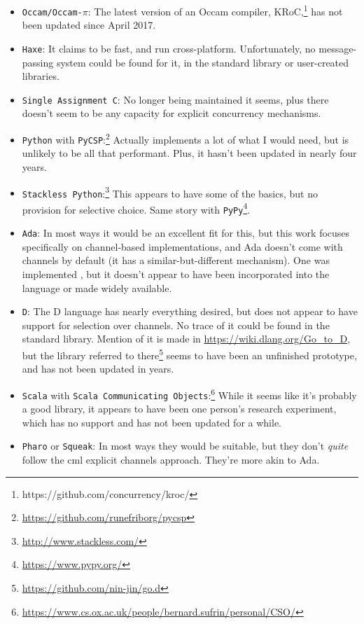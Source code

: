 \begin{itemize}
    \item \texttt{Occam/Occam-\(\pi\)}:  The latest version of an Occam compiler, KRoC,\footnote{https://github.com/concurrency/kroc/} has not been updated since April 2017.
    \item \texttt{Haxe}:  It claims to be fast, and run cross-platform.  Unfortunately, no message-passing system could be found for it, in the standard library or user-created libraries.
    \item \texttt{Single Assignment C}:  No longer being maintained it seems, plus there doesn't seem to be any capacity for explicit concurrency mechanisms.
    \item \texttt{Python} with \texttt{PyCSP}:\footnote{\url{https://github.com/runefriborg/pycsp}}  Actually implements a lot of what I would need, but is unlikely to be all that performant.  Plus, it hasn't been updated in nearly four years.
    \item \texttt{Stackless Python}:\footnote{\url{http://www.stackless.com/}} This appears to have some of the basics, but no provision for selective choice.  Same story with \texttt{PyPy}\footnote{\url{https://www.pypy.org/}}.
    \item \texttt{Ada}:  In most ways it would be an excellent fit for this, but this work focuses specifically on channel-based implementations, and Ada doesn't come with channels by default (it has a similar-but-different mechanism).  One was implemented \cite{Atiya2005}, but it doesn't appear to have been incorporated into the language or made widely available.
    \item \texttt{D}:  The D language has nearly everything desired, but does not appear to have support for selection over channels.  No trace of it could be found in the standard library.  Mention of it is made in \url{https://wiki.dlang.org/Go_to_D}, but the library referred to there\footnote{\url{https://github.com/nin-jin/go.d}} seems to have been an unfinished prototype, and has not been updated in years.
    \item \texttt{Scala} with \texttt{Scala Communicating Objects}:\footnote{\url{https://www.cs.ox.ac.uk/people/bernard.sufrin/personal/CSO/}}  While it seems like it's probably a good library, it appears to have been one person's research experiment, which has no support and has not been updated for a while.
    \item \texttt{Pharo} or \texttt{Squeak}:  In most ways they would be suitable, but they don't \emph{quite} follow the \gls{cml} explicit channels approach.  They're more akin to Ada.
\end{itemize}